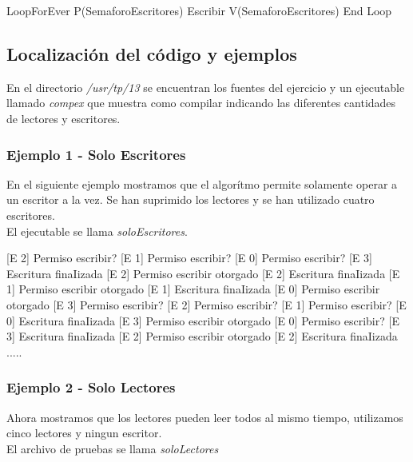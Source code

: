 \begin{scriptsize} 
\begin{verbatimtab} 
	
    LoopForEver
        P(SemaforoEscritores)
            Escribir
        V(SemaforoEscritores)
    End Loop

\end{verbatimtab}
\end{scriptsize}

\subsection{Localizaci\'on del c\'odigo y ejemplos}

En el directorio \emph{/usr/tp/13} se encuentran los fuentes del ejercicio y un ejecutable llamado \emph{compex} 
que muestra como compilar indicando las diferentes cantidades de lectores y escritores.\\

\subsubsection{Ejemplo 1 - Solo Escritores}

En el siguiente ejemplo mostramos que el algorítmo permite solamente operar a un escritor a la vez. 
Se han suprimido los lectores y se han utilizado cuatro escritores.\\
El ejecutable se llama \emph{soloEscritores}.


\begin{scriptsize} 
\begin{verbatimtab} 


[E 2] Permiso escribir?
[E 1] Permiso escribir?
[E 0] Permiso escribir?
[E 3] Escritura finaIizada
[E 2] Permiso escribir otorgado
[E 2] Escritura finaIizada
[E 1] Permiso escribir otorgado
[E 1] Escritura finaIizada
[E 0] Permiso escribir otorgado
[E 3] Permiso escribir?
[E 2] Permiso escribir?
[E 1] Permiso escribir?
[E 0] Escritura finaIizada
[E 3] Permiso escribir otorgado
[E 0] Permiso escribir?
[E 3] Escritura finaIizada
[E 2] Permiso escribir otorgado
[E 2] Escritura finaIizada
.....
\end{verbatimtab}
\end{scriptsize} 

\subsubsection{Ejemplo 2 - Solo Lectores}
Ahora mostramos que los lectores pueden leer todos al mismo tiempo, utilizamos cinco lectores y ningun escritor.\\
El archivo de pruebas se llama \emph{soloLectores}



